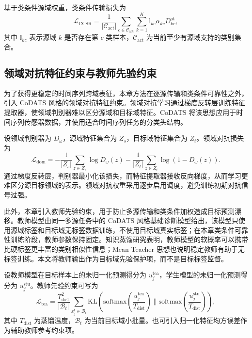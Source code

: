 \documentclass{seuthesis-2022}
\begin{document}
基于类条件源域权重，类条件传输损失为
\begin{equation}
    \mathcal{L}_{\mathrm{CCSR}}
    =
    \frac{1}{|\mathcal{C}_{\mathrm{act}}|}
    \sum_{c\in\mathcal{C}_{\mathrm{act}}}
    \sum_{k=1}^{K}
    \mathbb{I}_{kc}\alpha_{kc}
    D_{kc}^{\mathrm{ot}},
\end{equation}
其中 $\mathbb{I}_{kc}$ 表示源域 $k$ 是否存在第 $c$ 类样本，$\mathcal{C}_{\mathrm{act}}$ 为当前至少有源域支持的类别集合。

\subsection{领域对抗特征约束与教师先验约束}

为了获得更稳定的时间序列跨域表征，本章方法在逐源传输和类条件可靠性之外，引入 CoDATS 风格的领域对抗特征约束。领域对抗学习通过梯度反转层训练特征提取器，使领域判别器难以区分源域和目标域特征\cite{ganin2016dann}。CoDATS 将该思想应用于时间序列传感器数据，并使用适合时间序列任务的分类头结构\cite{wilson2020codats}。

设领域判别器为 $D_\omega$，源域特征集合为 $Z_s$，目标域特征集合为 $Z_t$。领域对抗损失为
\begin{equation}
    \mathcal{L}_{\mathrm{dom}}
    =
    -
    \frac{1}{|Z_s|}
    \sum_{z\in Z_s}
    \log D_\omega(z)
    -
    \frac{1}{|Z_t|}
    \sum_{z\in Z_t}
    \log(1-D_\omega(z)).
\end{equation}
通过梯度反转层，判别器最小化该损失，而特征提取器接收反向梯度，从而学习更难区分源目标领域的表示。领域对抗权重采用逐步启用调度，避免训练初期对抗信号过强。

此外，本章引入教师先验约束，用于防止多源传输和类条件加权造成目标预测漂移。教师模型由同一多源任务中的 CoDATS 风格基础诊断模型给出，该模型只使用源域标签和目标域无标签数据训练，不使用目标域真实标签；在本章类条件可靠性训练阶段，教师参数保持固定。知识蒸馏研究表明，教师模型的软概率可以携带比硬标签更丰富的类别相似性信息\cite{hinton2015distilling}；Mean Teacher 思想也说明稳定教师有助于无标签训练\cite{tarvainen2017meanteacher}。本文将教师输出作为目标域先验保护项，而不是目标标签监督。

设教师模型在目标样本上的未归一化预测得分为 $u_j^{\mathrm{tea}}$，学生模型的未归一化预测得分为 $u_j^{\mathrm{stu}}$。教师先验约束可写为
\begin{equation}
    \mathcal{L}_{\mathrm{tea}}
    =
    \frac{T_{\mathrm{dist}}^2}{|\mathcal{B}_t|}
    \sum_{x_j^t\in\mathcal{B}_t}
    \mathrm{KL}
    \left(
    \mathrm{softmax}\left(\frac{u_j^{\mathrm{tea}}}{T_{\mathrm{dist}}}\right)
    \|
    \mathrm{softmax}\left(\frac{u_j^{\mathrm{stu}}}{T_{\mathrm{dist}}}\right)
    \right),
\end{equation}
其中 $T_{\mathrm{dist}}$ 为蒸馏温度，$\mathcal{B}_t$ 为当前目标域小批量。也可引入归一化特征均方误差作为辅助教师参考约束项。
\end{document}
